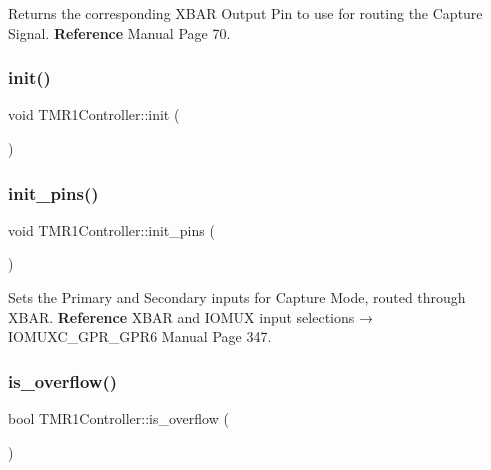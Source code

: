 Returns the corresponding X\+B\+AR Output Pin to use for routing the Capture Signal. {\bfseries Reference} Manual Page 70. 

\mbox{\label{classTMR1Controller_af92315e340766e3857eb6a20e7cab673}} 
\subsubsection{\texorpdfstring{init()}{init()}}
{\footnotesize\ttfamily void T\+M\+R1\+Controller\+::init (\begin{DoxyParamCaption}{ }\end{DoxyParamCaption})\hspace{0.3cm}{\ttfamily [inline]}}

\mbox{\label{classTMR1Controller_a1c5d358760aa98641333f63c7bcacd3a}} 
\subsubsection{\texorpdfstring{init\+\_\+pins()}{init\_pins()}}
{\footnotesize\ttfamily void T\+M\+R1\+Controller\+::init\+\_\+pins (\begin{DoxyParamCaption}{ }\end{DoxyParamCaption})\hspace{0.3cm}{\ttfamily [inline]}}



Sets the Primary and Secondary inputs for Capture Mode, routed through X\+B\+AR. {\bfseries Reference} X\+B\+AR and I\+O\+M\+UX input selections → I\+O\+M\+U\+X\+C\+\_\+\+G\+P\+R\+\_\+\+G\+P\+R6 Manual Page 347. 

\mbox{\label{classTMR1Controller_a06052b4a881156be3c7a4b6495d8ca11}} 
\subsubsection{\texorpdfstring{is\+\_\+overflow()}{is\_overflow()}}
{\footnotesize\ttfamily bool T\+M\+R1\+Controller\+::is\+\_\+overflow (\begin{DoxyParamCaption}{ }\end{DoxyParamCaption})\hspace{0.3cm}{\ttfamily [inline]}}



